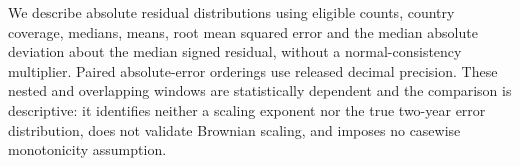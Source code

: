 We describe absolute residual distributions using eligible counts, country coverage, medians, means, root mean squared error and the median absolute deviation about the median signed residual, without a normal-consistency multiplier. Paired absolute-error orderings use released decimal precision. These nested and overlapping windows are statistically dependent and the comparison is descriptive: it identifies neither a scaling exponent nor the true two-year error distribution, does not validate Brownian scaling, and imposes no casewise monotonicity assumption.
